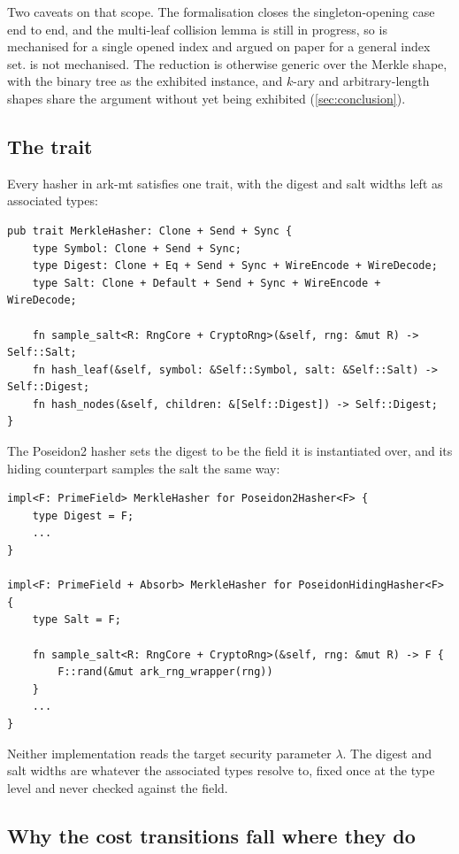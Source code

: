 Two caveats on that scope.  The formalisation closes the singleton-opening case end to
end, and the multi-leaf collision lemma is still in progress, so  is
mechanised for a single opened index and argued on paper for a general index set.
 is not mechanised.  The reduction is otherwise generic over the Merkle
shape, with the binary tree as the exhibited instance, and $k$-ary and arbitrary-length
shapes share the argument without yet being exhibited (\cref{sec:conclusion}).

\subsection{The  trait}
\label{app:hasher-trait}

Every hasher in \textsf{ark-mt} satisfies one trait, with the digest and salt widths left
as associated types:

\begin{verbatim}
pub trait MerkleHasher: Clone + Send + Sync {
    type Symbol: Clone + Send + Sync;
    type Digest: Clone + Eq + Send + Sync + WireEncode + WireDecode;
    type Salt: Clone + Default + Send + Sync + WireEncode + WireDecode;

    fn sample_salt<R: RngCore + CryptoRng>(&self, rng: &mut R) -> Self::Salt;
    fn hash_leaf(&self, symbol: &Self::Symbol, salt: &Self::Salt) -> Self::Digest;
    fn hash_nodes(&self, children: &[Self::Digest]) -> Self::Digest;
}
\end{verbatim}

The Poseidon2 hasher sets the digest to be the field it is instantiated over, and its
hiding counterpart samples the salt the same way:

\begin{verbatim}
impl<F: PrimeField> MerkleHasher for Poseidon2Hasher<F> {
    type Digest = F;
    ...
}

impl<F: PrimeField + Absorb> MerkleHasher for PoseidonHidingHasher<F> {
    type Salt = F;

    fn sample_salt<R: RngCore + CryptoRng>(&self, rng: &mut R) -> F {
        F::rand(&mut ark_rng_wrapper(rng))
    }
    ...
}
\end{verbatim}

Neither implementation reads the target security parameter $\lambda$.  The digest and salt
widths are whatever the associated types resolve to, fixed once at the type level and never
checked against the field.

\subsection{Why the cost transitions fall where they do}
\label{app:hash-blocks}

